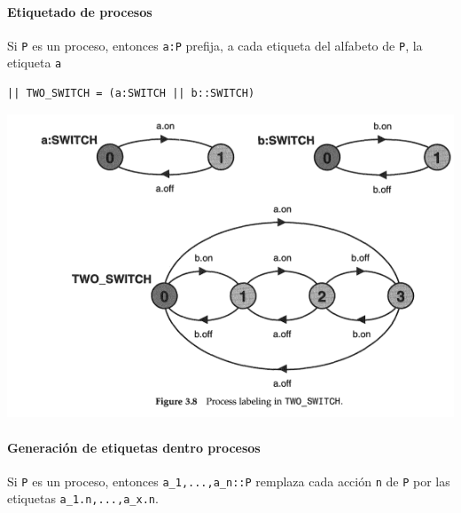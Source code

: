 \paragraph{Etiquetado de procesos}
Si \texttt{P} es un proceso, entonces \texttt{a:P} prefija, a cada etiqueta del alfabeto de \texttt{P}, la etiqueta \texttt{a}

\begin{verbatim}
|| TWO_SWITCH = (a:SWITCH || b::SWITCH)
\end{verbatim}
\begin{center}
\includegraphics[scale=0.5]{imagenes/lts-dosSwitches}
\end{center}

\paragraph{Generación de etiquetas dentro procesos}
Si \texttt{P} es un proceso, entonces \texttt{{a\_1,...,a\_n}::P} remplaza cada acción \texttt{n} de \texttt{P} por las etiquetas \texttt{a\_1.n,...,a\_x.n}. 

